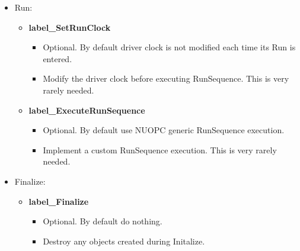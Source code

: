 \begin{itemize}
\begin{itemize}
\begin{itemize}
    \end{itemize}
  \end{itemize}
  \item Run:
  \begin{itemize}
    \item {\bf label\_SetRunClock}
      \begin{itemize}
        \item Optional. By default driver clock is not modified each time its Run is entered.
        \item Modify the driver clock before executing RunSequence. This is very rarely needed.
      \end{itemize}
    \item {\bf label\_ExecuteRunSequence}
    \begin{itemize}
      \item Optional. By default use NUOPC generic RunSequence execution.
      \item Implement a custom RunSequence execution. This is very rarely needed.
    \end{itemize}
  \end{itemize}
  \item Finalize:
  \begin{itemize}
    \item {\bf label\_Finalize}
    \begin{itemize}
      \item Optional. By default do nothing.
      \item Destroy any objects created during Initalize.
    \end{itemize}
  \end{itemize}
\end{itemize}


\mbox{}\hrulefill\ 


